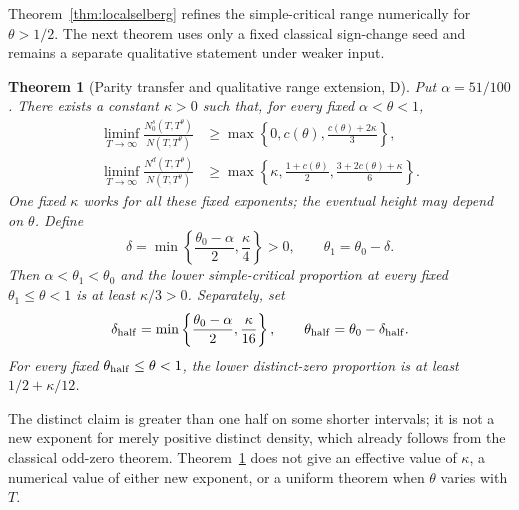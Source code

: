 \documentclass[11pt]{article}
\newtheorem{theorem}{Theorem}[section]
\theoremstyle{remark}
\begin{document}
Theorem~\ref{thm:localselberg} refines the simple-critical range numerically
for $\theta>1/2$. The next theorem uses only a fixed classical sign-change
seed and remains a separate qualitative statement under weaker input.

\begin{theorem}[Parity transfer and qualitative range extension, D]
\label{thm:parity}
Put $\alpha=51/100$. There exists a constant $\kappa>0$ such that, for
every fixed $\alpha<\theta<1$,
\begin{align}
\liminf_{T\to\infty}\frac{N_0^s(T,T^\theta)}{N(T,T^\theta)}
&\ge\max\left\{0,c(\theta),\frac{c(\theta)+2\kappa}{3}\right\},
\label{eq:paritysimple}\\
\liminf_{T\to\infty}\frac{N^d(T,T^\theta)}{N(T,T^\theta)}
&\ge\max\left\{\kappa,\frac{1+c(\theta)}2,
                    \frac{3+2c(\theta)+\kappa}{6}\right\}.
\label{eq:paritydistinct}
\end{align}
One fixed $\kappa$ works for all these fixed exponents; the eventual height
may depend on $\theta$. Define
\begin{equation}\label{eq:paritydelta}
\delta=\min\left\{\frac{\theta_0-\alpha}{2},\frac\kappa4\right\}>0,
\qquad \theta_1=\theta_0-\delta.
\end{equation}
Then $\alpha<\theta_1<\theta_0$ and the lower simple-critical proportion
at every fixed $\theta_1\le\theta<1$ is at least $\kappa/3>0$.
Separately, set
\begin{equation}\label{eq:halfdelta}
\delta_{\rm half}=\min\left\{\frac{\theta_0-\alpha}{2},
                                      \frac\kappa{16}\right\},
\qquad \theta_{\rm half}=\theta_0-\delta_{\rm half}.
\end{equation}
For every fixed $\theta_{\rm half}\le\theta<1$, the lower distinct-zero
proportion is at least $1/2+\kappa/12$.
\end{theorem}

The distinct claim is greater than one half on some shorter intervals; it
is not a new exponent for merely positive distinct density, which already
follows from the classical odd-zero theorem. Theorem~\ref{thm:parity}
does not give an effective value of $\kappa$, a numerical value of either
new exponent, or a uniform theorem when $\theta$ varies with $T$.
\end{document}
